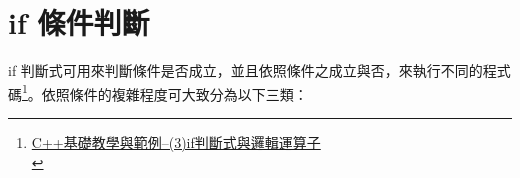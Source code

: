 \documentclass[a4paper,12pt]{article}
\begin{document}
\section{if 條件判斷}
\label{cpp_ifelse}
if 判斷式可用來判斷條件是否成立，並且依照條件之成立與否，來執行不同的程式碼\footnote{\href{https://crmne0707.pixnet.net/blog/post/285395384-c\%2B\%2B\%E5\%9F\%BA\%E7\%A4\%8E\%E6\%95\%99\%E5\%AD\%B8\%E8\%88\%87\%E7\%AF\%84\%E4\%BE\%8B--https://crmne0707.pixnet.net/blog/post/285395384-c\%2B\%2B\%E5\%9F\%BA\%E7\%A4\%8E\%E6\%95\%99\%E5\%AD\%B8\%E8\%88\%87\%E7\%AF\%84\%E4\%BE\%8B--\%283\%29if\%E5\%88\%A4\%E6\%96\%B7\%E5\%BC\%8F\%E8\%88\%87\%E9\%82\%8F\%E8\%BC\%AF\%E9\%81\%8B\%E7\%AE\%97\%E5\%AD\%90}{C++基礎教學與範例--(3)if判斷式與邏輯運算子}\\}。依照條件的複雜程度可大致分為以下三類：\\
\end{document}

